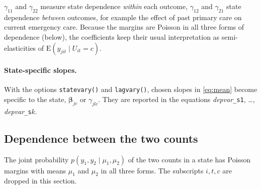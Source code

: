 \documentclass[11pt,a4paper]{article}
\newcommand{\cmd}[1]{\texttt{#1}}
\newcommand{\E}{\mathrm E}
\begin{document}
$\gamma_{11}$ and $\gamma_{22}$ measure state dependence \emph{within} each outcome, $\gamma_{12}$ and
$\gamma_{21}$ state dependence \emph{between} outcomes, for example the effect of past primary care on
current emergency care. Because the margins are Poisson in all three forms of dependence (below), the
coefficients keep their usual interpretation as semi-elasticities of $\E(y_{jit}\mid U_{it}=c)$.

\paragraph{State-specific slopes.} With the options \cmd{statevary()} and \cmd{lagvary()}, chosen
slopes in \eqref{eq:mean} become specific to the state, $\bm\beta_{jc}$ or $\gamma_{jlc}$. They are
reported in the equations \textit{depvar}\cmd{\_s1}, \dots, \textit{depvar}\cmd{\_s}$k$.

\subsection{Dependence between the two counts}\label{sec:dep}

The joint probability $p(y_1,y_2\mid\mu_1,\mu_2)$ of the two counts in a state has Poisson margins
with means $\mu_1$ and $\mu_2$ in all three forms. The subscripts $i,t,c$ are dropped in this section.
\end{document}

